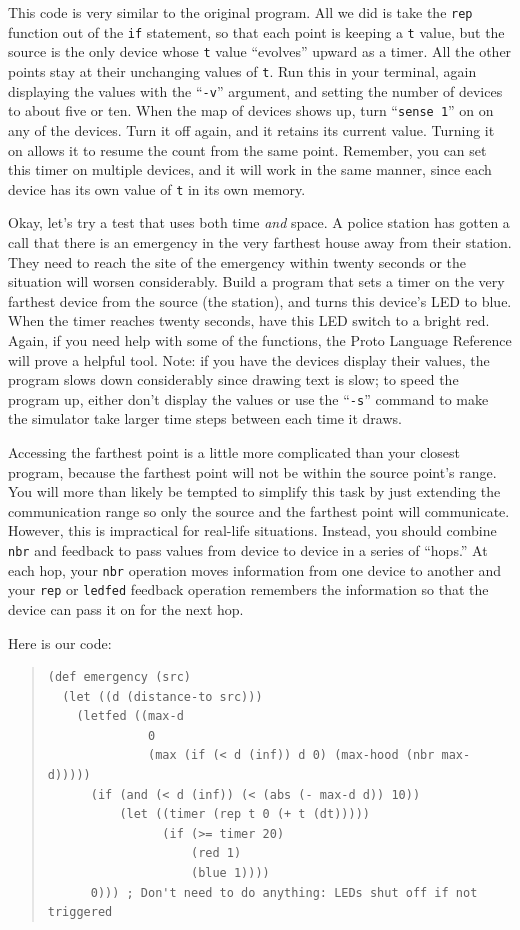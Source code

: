 \documentclass{article}
\newcommand\var[1]{{\tt #1}}
\newcommand\qvar[1]{``{\tt #1}''}
\begin{document}
This code is very similar to the original program. All we did is take
the \var{rep} function out of the \var{if} statement, so that each
point is keeping a \var{t} value, but the source is the only device
whose \var{t} value ``evolves'' upward as a timer.  All the other
points stay at their unchanging values of \var{t}.  Run this in your
terminal, again displaying the values with the \qvar{-v} argument, and
setting the number of devices to about five or ten.  When the map of
devices shows up, turn \qvar{sense 1} on on any of the devices.  Turn
it off again, and it retains its current value.  Turning it on allows
it to resume the count from the same point.  Remember, you can set
this timer on multiple devices, and it will work in the same manner,
since each device has its own value of \var{t} in its own memory.

Okay, let's try a test that uses both time {\em and} space.  A police
station has gotten a call that there is an emergency in the very
farthest house away from their station.  They need to reach the site
of the emergency within twenty seconds or the situation will worsen
considerably.  Build a program that sets a timer on the very farthest
device from the source (the station), and turns this device's LED to
blue.  When the timer reaches twenty seconds, have this LED switch to
a bright red.  Again, if you need help with some of the functions, the
Proto Language Reference will prove a helpful tool.  Note: if you have
the devices display their values, the program slows down considerably
since drawing text is slow; to speed the program up, either don't
display the values or use the \qvar{-s} command to make the simulator
take larger time steps between each time it draws.

Accessing the farthest point is a little more complicated than your
closest program, because the farthest point will not be within the
source point's range.  You will more than likely be tempted to
simplify this task by just extending the communication range so only
the source and the farthest point will communicate.  However, this is
impractical for real-life situations.  Instead, you should combine
\var{nbr} and feedback to pass values from device to device in a
series of ``hops.''  At each hop, your \var{nbr} operation moves
information from one device to another and your \var{rep} or
\var{ledfed} feedback operation remembers the information so that the
device can pass it on for the next hop.

Here is our code:
\begin{quote}
\begin{verbatim}
(def emergency (src) 
  (let ((d (distance-to src))) 
    (letfed ((max-d 
              0 
              (max (if (< d (inf)) d 0) (max-hood (nbr max-d)))))
      (if (and (< d (inf)) (< (abs (- max-d d)) 10)) 
          (let ((timer (rep t 0 (+ t (dt)))))                        
                (if (>= timer 20) 
                    (red 1) 
                    (blue 1))))
      0))) ; Don't need to do anything: LEDs shut off if not triggered
\end{verbatim}
\end{quote}
\end{document}
